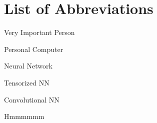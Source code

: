 \section{List of Abbreviations}

\begin{description}[leftmargin=!,labelwidth=2cm]
    \item [VIP] Very Important Person
    \item [PC] Personal Computer
    \item [NN] Neural Network
    \item [TNN] Tensorized NN
    \item [CNN] Convolutional NN
    \item [hmm] Hmmmmmm

\end{description}